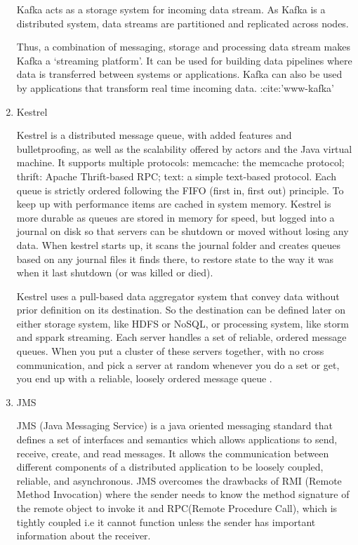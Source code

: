 \begin{enumerate}
 Kafka acts as a storage system for incoming data
stream. As Kafka is a distributed system, data streams are
partitioned and replicated across nodes.

Thus, a combination of messaging, storage and processing data
stream makes Kafka a ‘streaming platform’. It can be used for
building data pipelines where data is transferred between systems
or applications. Kafka can also be used by applications that
transform real time incoming data. :cite:'www-kafka'

\item {} 
Kestrel

Kestrel is a distributed message queue, with added features and
bulletproofing, as well as the scalability offered by actors and
the Java virtual machine. It supports multiple protocols:
memcache: the memcache protocol; thrift: Apache Thrift-based RPC;
text: a simple text-based protocol. Each queue is strictly
ordered following the FIFO (first in, first out) principle. To
keep up with performance items are cached in system
memory. Kestrel is more durable as queues are stored in memory
for speed, but logged into a journal on disk so that servers can
be shutdown or moved without losing any data. When kestrel starts
up, it scans the journal folder and creates queues based on any
journal files it finds there, to restore state to the way it was
when it last shutdown (or was killed or died).

Kestrel uses a pull-based data aggregator system that convey data
without prior definition on its destination. So the destination
can be defined later on either storage system, like HDFS or
NoSQL, or processing system, like storm and sppark
streaming. Each server handles a set of reliable, ordered message
queues. When you put a cluster of these servers together, with no
cross communication, and pick a server at random whenever you do
a set or get, you end up with a reliable, loosely ordered message
queue \label{\detokenize{i524/technologies:id321}}{\hyperref[\detokenize{i524/technologies:git-kestrel}]{\sphinxcrossref{{[}272{]}}}}.

\item {} 
JMS

JMS (Java Messaging Service) is a java oriented messaging
standard that defines a set of interfaces and semantics which
allows applications to send, receive, create, and read messages.
It allows the communication between different components of a
distributed application to be loosely coupled, reliable, and
asynchronous. \label{\detokenize{i524/technologies:id322}}{\hyperref[\detokenize{i524/technologies:www-jms-wiki}]{\sphinxcrossref{{[}273{]}}}} JMS overcomes the drawbacks of
RMI (Remote Method Invocation) where the sender needs to know the
method signature of the remote object to invoke it and RPC(Remote
Procedure Call), which is tightly coupled i.e it cannot function
unless the sender has important information about the receiver.


\end{enumerate}
